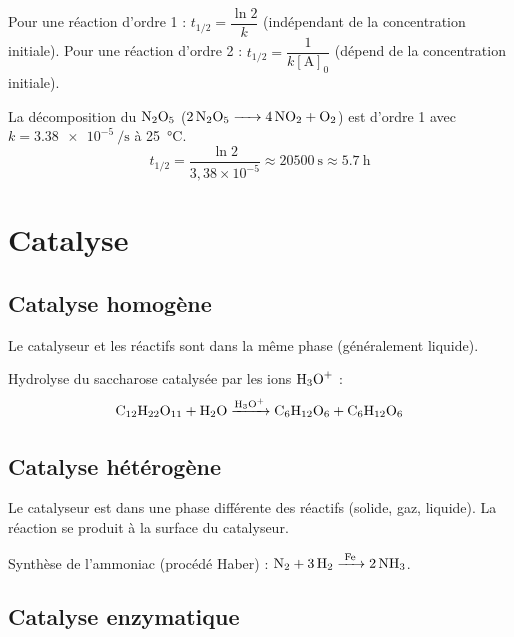 \begin{propriete}
Pour une réaction d'ordre 1 : $t_{1/2} = \dfrac{\ln 2}{k}$ (indépendant de la concentration initiale).
Pour une réaction d'ordre 2 : $t_{1/2} = \dfrac{1}{k[\mathrm{A}]_0}$ (dépend de la concentration initiale).
\end{propriete}

\begin{exemple}
La décomposition du $\ce{N2O5}$ ($\ce{2 N2O5 -> 4 NO2 + O2}$) est d'ordre 1 avec $k = \SI{3,38e-5}{\per\second}$ à \SI{25}{\celsius}. 
\[
t_{1/2} = \frac{\ln 2}{3,38\times10^{-5}} \approx \SI{20500}{\second} \approx \SI{5,7}{\hour}
\]
\end{exemple}

\section{Catalyse}

\subsection{Catalyse homogène}

\begin{definition}
Le catalyseur et les réactifs sont dans la même phase (généralement liquide).
\end{definition}

\begin{exemple}
Hydrolyse du saccharose catalysée par les ions $\ce{H3O+}$ :
\[
\ce{C12H22O11 + H2O ->[H3O+] C6H12O6 + C6H12O6}
\]
\end{exemple}

\subsection{Catalyse hétérogène}

\begin{definition}
Le catalyseur est dans une phase différente des réactifs (solide, gaz, liquide). La réaction se produit à la surface du catalyseur.
\end{definition}

\begin{exemple}
Synthèse de l'ammoniac (procédé Haber) : $\ce{N2 + 3 H2 ->[Fe] 2 NH3}$.
\end{exemple}

\subsection{Catalyse enzymatique}

